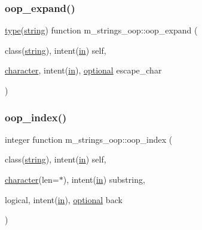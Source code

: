 \subsubsection{\texorpdfstring{oop\+\_\+expand()}{oop\_expand()}}
{\footnotesize\ttfamily \hyperlink{stop__watch_83_8txt_a70f0ead91c32e25323c03265aa302c1c}{type}(\hyperlink{structm__strings__oop_1_1string}{string}) function m\+\_\+strings\+\_\+oop\+::oop\+\_\+expand (\begin{DoxyParamCaption}\item[{class(\hyperlink{structm__strings__oop_1_1string}{string}), intent(\hyperlink{M__journal_83_8txt_afce72651d1eed785a2132bee863b2f38}{in})}]{self,  }\item[{\hyperlink{option__stopwatch_83_8txt_abd4b21fbbd175834027b5224bfe97e66}{character}, intent(\hyperlink{M__journal_83_8txt_afce72651d1eed785a2132bee863b2f38}{in}), \hyperlink{option__stopwatch_83_8txt_aa4ece75e7acf58a4843f70fe18c3ade5}{optional}}]{escape\+\_\+char }\end{DoxyParamCaption})\hspace{0.3cm}{\ttfamily [private]}}

\mbox{\label{namespacem__strings__oop_aafe02b26ccba21eb8a35e9fa99d6c790}} 
\subsubsection{\texorpdfstring{oop\+\_\+index()}{oop\_index()}}
{\footnotesize\ttfamily integer function m\+\_\+strings\+\_\+oop\+::oop\+\_\+index (\begin{DoxyParamCaption}\item[{class(\hyperlink{structm__strings__oop_1_1string}{string}), intent(\hyperlink{M__journal_83_8txt_afce72651d1eed785a2132bee863b2f38}{in})}]{self,  }\item[{\hyperlink{option__stopwatch_83_8txt_abd4b21fbbd175834027b5224bfe97e66}{character}(len=$\ast$), intent(\hyperlink{M__journal_83_8txt_afce72651d1eed785a2132bee863b2f38}{in})}]{substring,  }\item[{logical, intent(\hyperlink{M__journal_83_8txt_afce72651d1eed785a2132bee863b2f38}{in}), \hyperlink{option__stopwatch_83_8txt_aa4ece75e7acf58a4843f70fe18c3ade5}{optional}}]{back }\end{DoxyParamCaption})\hspace{0.3cm}{\ttfamily [private]}}

